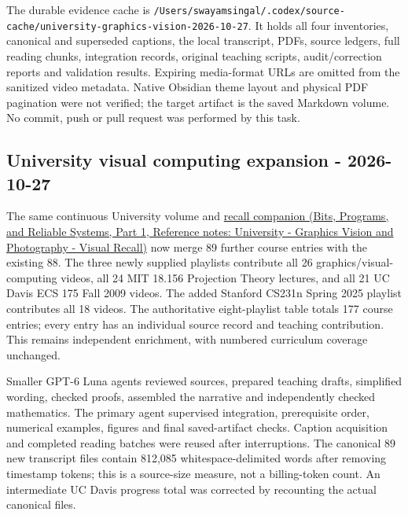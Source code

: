The durable evidence cache is \texttt{/Users/swayamsingal/.codex/source-cache/university-graphics-vision-2026-10-27}. It holds all four inventories, canonical and superseded captions, the local transcript, PDFs, source ledgers, full reading chunks, integration records, original teaching scripts, audit/correction reports and validation results. Expiring media-format URLs are omitted from the sanitized video metadata. Native Obsidian theme layout and physical PDF pagination were not verified; the target artifact is the saved Markdown volume. No commit, push or pull request was performed by this task.

\subsection{University visual computing expansion - 2026-10-27}\label{appendix-a103e7846d21-university-visual-computing-expansion---2026-10-27}

\hypertarget{appendix-a103e7846d21-university-visual-computing-expansion---2026-10-27}{}

The same {continuous University volume} and \href{../01-Bits-Programs-and-Reliable-Systems-P01/main.pdf\#nameddest=appendix-a8f634b076b5}{recall companion (Bits, Programs, and Reliable Systems, Part 1, Reference notes: University - Graphics Vision and Photography - Visual Recall)} now merge 89 further course entries with the existing 88. The three newly supplied playlists contribute all 26 graphics/visual-computing videos, all 24 MIT 18.156 Projection Theory lectures, and all 21 UC Davis ECS 175 Fall 2009 videos. The added Stanford CS231n Spring 2025 playlist contributes all 18 videos. The authoritative eight-playlist table totals 177 course entries; every entry has an individual source record and teaching contribution. This remains independent enrichment, with numbered curriculum coverage unchanged.

Smaller GPT-6 Luna agents reviewed sources, prepared teaching drafts, simplified wording, checked proofs, assembled the narrative and independently checked mathematics. The primary agent supervised integration, prerequisite order, numerical examples, figures and final saved-artifact checks. Caption acquisition and completed reading batches were reused after interruptions. The canonical 89 new transcript files contain 812,085 whitespace-delimited words after removing timestamp tokens; this is a source-size measure, not a billing-token count. An intermediate UC Davis progress total was corrected by recounting the actual canonical files.

